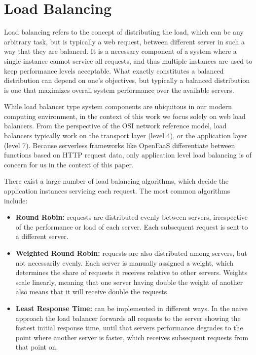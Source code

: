 \section{Load Balancing}
Load balancing refers to the concept of distributing the load, which can be any arbitrary task, but is typically a web request, between different server in such a way that they are balanced.
It is a necessary component of a system where a single instance cannot service all requests, and thus multiple instances are used to keep performance levels acceptable.
What exactly constitutes a balanced distribution can depend on one's objectives, but typically a balanced distribution is one that maximizes overall system performance over the available servers\cite{cardelliniDynamicLoadBalancing1999a}.

While load balancer type system components are ubiquitous in our modern computing environment, in the context of this work we focus solely on web load balancers.
From the perspective of the OSI network reference model\cite{dayOSIReferenceModel1983}, load balancers typically work on the transport layer (level 4), or the application layer (level 7).
Because serverless frameworks like OpenFaaS differentiate between functions based on HTTP request data, only application level load balancing is of concern for us in the context of this paper.

There exist a large number of load balancing algorithms, which decide the application instances servicing each request.
The most common algorithms include:
\begin{itemize}
    \item \textbf{Round Robin:} requests are distributed evenly between servers, irrespective of the performance or load of each server. Each subsequent request is sent to a different server.
    \item \textbf{Weighted Round Robin:} requests are also distributed among servers, but not necessarily evenly. Each server is manually assigned a weight, which determines the share of requests it receives relative to other servers. Weights scale linearly, meaning that one server having double the weight of another also means that it will receive double the requests
    \item \textbf{Least Response Time:} can be implemented in different ways. In the naive approach the load balancer forwards all requests to the server showing the fastest initial response time, until that servers performance degrades to the point where another server is faster, which receives subsequent requests from that point on.
\end{itemize}

